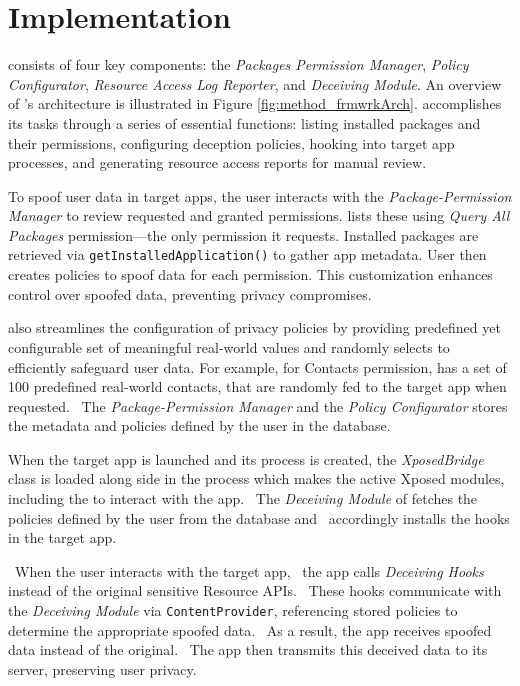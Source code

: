 \section{Implementation}
\label{sec:architecture}

\framework{} consists of four key components: the \textit{Packages Permission Manager}, \textit{Policy Configurator}, \textit{Resource Access Log Reporter}, and \textit{Deceiving Module}. An overview of \framework{}'s architecture is illustrated in Figure \ref{fig:method_frmwrkArch}. \framework{} accomplishes its tasks through a series of essential functions: listing installed packages and their permissions, configuring deception policies, hooking into target app processes, and generating resource access reports for manual review.

To spoof user data in target apps, the user interacts with the \textit{Package-Permission Manager} to review requested and granted permissions. \framework{} lists these using \textit{Query All Packages} permission—the only permission it requests. Installed packages are retrieved via \texttt{getInstalledApplication()} to gather app metadata. User then creates policies to spoof data for each permission. 
This customization enhances control over spoofed data, preventing privacy compromises.

\framework{} also streamlines the configuration of privacy policies by providing predefined yet configurable set of meaningful real-world values and randomly selects to efficiently safeguard user data. For example, for Contacts permission, \framework{} has a set of 100 predefined real-world contacts, that are randomly fed to the target app when requested. ~The \textit{Package-Permission Manager} and the \textit{Policy Configurator} stores the metadata and policies defined by the user in the database. 

When the target app is launched and its process is created, the \textit{XposedBridge} class is loaded along side in the process which makes the active Xposed modules, including the \framework{} to interact with the app. ~The \textit{Deceiving Module} of \framework{} fetches the policies defined by the user from the database and ~accordingly installs the hooks in the target app.

~When the user interacts with the target app, ~the app calls \textit{Deceiving Hooks} instead of the original sensitive Resource APIs. ~These hooks communicate with the \textit{Deceiving Module} via \texttt{ContentProvider}, referencing stored policies to determine the appropriate spoofed data. ~As a result, the app receives spoofed data instead of the original. ~The app then transmits this deceived data to its server, preserving user privacy.

